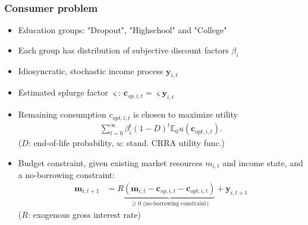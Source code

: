 \documentclass[pdflatex]{beamer}
\begin{document}
\begin{frame}
\frametitle{Consumer problem}


	\begin{itemize}
		\item Education groups: "Dropout", "Highschool" and "College"
		\item Each group has distribution of subjective discount factors $\beta_i$
		\item Idiosyncratic, stochastic income process $\mathbf{y}_{i,t}$
		\item Estimated splurge factor $\varsigma$: $\mathbf{c}_{sp,i,t} = \varsigma \mathbf{y}_{i,t}$
		\item Remaining consumption $c_{opt,i,t}$ is chosen to maximize utility
			\begin{align}
			\sum_{t=0}^{\infty}\beta_i^t (1-D)^t \mathbb{E}_0 u(\mathbf{c}_{opt,i,t}).
			\end{align}
			($D$: end-of-life probability, $u$: stand. CRRA utility func.)	
		\item Budget constraint, given existing market resources $m_{i,t}$ and income state, and a no-borrowing constraint: 
		\begin{align}
		\mathbf{m}_{i,t+1} &= R \underbrace{(\mathbf{m}_{i,t} - \mathbf{c}_{sp,i,t} - \mathbf{c}_{opt,i,t})}_{\geq 0 \text{ (no-borrowing constraint)}} + \mathbf{y}_{i,t+1}
		\end{align}
		($R$: exogenous gross interest rate)
	\end{itemize}



\end{frame}
\end{document}
